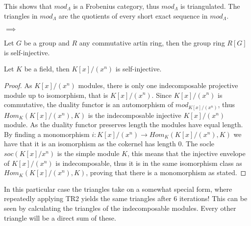     This shows that $mod_{\Lambda}$ is a Frobenius category, thus \underline{$mod_{\Lambda}$} is triangulated. The triangles in \underline{$mod_{\Lambda}$} are the quotients of every short exact sequence in $mod_{\Lambda}$.
    \begin{center}
        $\implies$
    \end{center}

    \begin{prop}
        Let $G$ be a group and $R$ any commutative artin ring, then the group ring $R[G]$ is self-injective.
    \end{prop}


    \begin{prop}
        Let $K$ be a field, then $K[x]/(x^n)$ is self-injective.
    \end{prop}

    \begin{proof}
        As $K[x]/(x^n)$ modules, there is only one indecomposable projective module up to isomorphism, that is $K[x]/(x^n)$. Since $K[x]/(x^n)$ is commutative, the duality functor is an automorphism of $mod_{K[x]/(x^n)}$, thus $Hom_K(K[x]/(x^n),K)$ is the indecomposable injective $K[x]/(x^n)$ module. As the duality functor preserves length the modules have equal length. By finding a monomorphism $i:K[x]/(x^n)\rightarrow Hom_K(K[x]/(x^n),K)$ we have that it is an isomorphism as the cokernel has length $0$. The socle $soc(K[x]/x^n)$ is the simple module $K$, this means that the injective envelope of $K[x]/(x^n)$ is indecomposable, thus it is in the same isomorphism class as $Hom_K(K[x]/(x^n),K)$, proving that there is a monomorphism as stated.
    \end{proof}

    In this particular case the triangles take on a somewhat special form, where repeatedly applying TR2 yields the same triangles after 6 iterations! This can be seen by calculating the triangles of the indecomposable modules. Every other triangle will be a direct sum of these.


